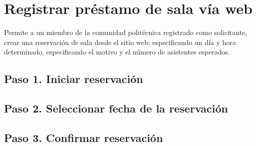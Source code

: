 \chapter{Registrar préstamo de sala vía web}
	Permite a un miembro de la comunidad politécnica registrado como 
	solicitante, crear una reservación de sala desde el sitio web; 
	especificando un día y hora determinado, especificando el motivo
	y el número de asistentes esperados.


\section{Paso 1. Iniciar reservación}
	

\section{Paso 2. Seleccionar fecha de la reservación}
	

\section{Paso 3. Confirmar reservación}
	
